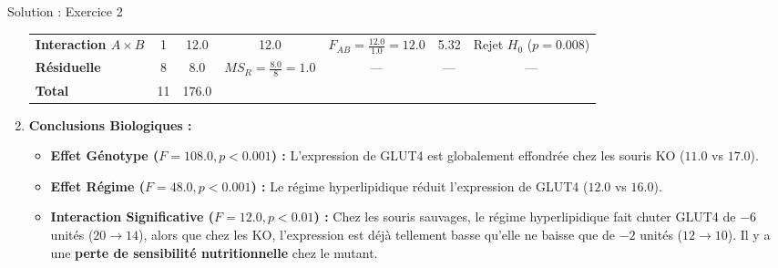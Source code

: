 \documentclass[11pt,a4paper]{article}
\begin{document}
\begin{solutionbox}{Solution : Exercice 2}
\begin{enumerate}[label=\textbf{\alph*.}]
\begin{center}
{\begin{tabular}{lcccccc}
  \textbf{Interaction $A \times B$} & 1 & 12.0 & 12.0 & $F_{AB} = \frac{12.0}{1.0} = \mathbf{12.0}$ & 5.32 & Rejet $H_0$ ($p = 0.008$) \\
  \textbf{Résiduelle} & 8 & 8.0 & $MS_R = \frac{8.0}{8} = 1.0$ & --- & --- & --- \\
  \midrule
  \textbf{Total} & 11 & 176.0 & & & & \\
  \bottomrule
  \end{tabular}%
  }
  \end{center}
  \item \textbf{Conclusions Biologiques :}
  \begin{itemize}
    \item \textbf{Effet Génotype ($F = 108.0, p < 0.001$) :} L'expression de GLUT4 est globalement effondrée chez les souris KO ($11.0$ vs $17.0$).
    \item \textbf{Effet Régime ($F = 48.0, p < 0.001$) :} Le régime hyperlipidique réduit l'expression de GLUT4 ($12.0$ vs $16.0$).
    \item \textbf{Interaction Significative ($F = 12.0, p < 0.01$) :} Chez les souris sauvages, le régime hyperlipidique fait chuter GLUT4 de $-6$ unités ($20 \rightarrow 14$), alors que chez les KO, l'expression est déjà tellement basse qu'elle ne baisse que de $-2$ unités ($12 \rightarrow 10$). Il y a une \textbf{perte de sensibilité nutritionnelle} chez le mutant.
  \end{itemize}
\end{enumerate}
\end{solutionbox}
\end{document}
